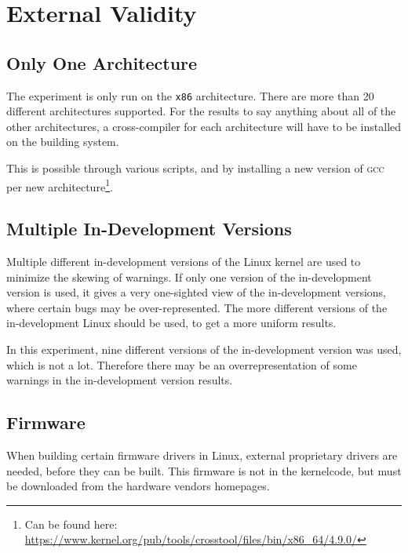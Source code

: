 \documentclass[a4paper,11pt]{report}
\newcommand{\f}{\footnote{\fn}}
\begin{document}
            \section{External Validity}
            \label{sec:extval}


            \subsection*{Only One Architecture}

The experiment is only run on the \texttt{x86} architecture. There are more than
20 different architectures supported. For the results to say anything about all 
of the other architectures, a cross-compiler for each architecture will have to
be installed on the building system.

            \def \fn {Can be found here: 
            \url{https://www.kernel.org/pub/tools/crosstool/files/bin/x86_64/4.9.0/}}

This is possible through various scripts, and by installing a new version of
\textsc{gcc} per new architecture\f.


            \subsection*{Multiple In-Development Versions}

Multiple different in-development versions of the Linux kernel are used to 
minimize the skewing of warnings. If only one version of the in-development 
version is used, it gives a very one-sighted view of the in-development 
versions, where certain bugs may be over-represented. The more different 
versions of the in-development Linux should be used, to get a more uniform 
results.

In this experiment, nine different versions of the in-development version was 
used, which is not a lot. Therefore there may be an overrepresentation of 
some warnings in the in-development version results. 


            \subsection*{Firmware}
When building certain firmware drivers in Linux, external proprietary drivers 
are needed, before they can be built. This firmware is not in the kernelcode, 
but must be downloaded from the hardware vendors homepages.
\\
\end{document}
